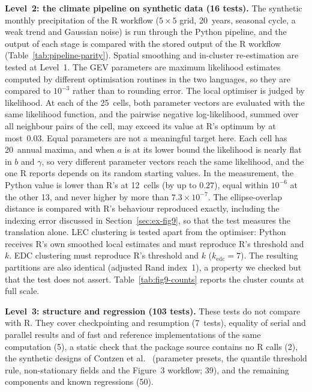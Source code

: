 \documentclass[preprint,12pt,a4paper]{elsarticle}
\begin{document}
{\textbf{Level~2: the climate pipeline on synthetic data (16 tests).}
The synthetic monthly precipitation of the R workflow ($5{\times}5$
grid, 20~years, seasonal cycle, a weak trend and Gaussian noise) is
run through the Python pipeline, and the output of each stage is
compared with the stored output of the R workflow
(Table~\ref{tab:pipeline-parity}). Spatial smoothing and in-cluster
re-estimation are tested at Level~1. The GEV parameters are maximum
likelihood estimates computed by different optimisation routines in
the two languages, so they are compared to $10^{-3}$ rather than to
rounding error.
The local optimiser is judged by likelihood. At each of the
25~cells, both parameter vectors are evaluated with the same
likelihood function, and the pairwise negative log-likelihood,
summed over all neighbour pairs of the cell, may exceed its value at
R's optimum by at most~0.03. Equal parameters are not a meaningful
target here. Each cell has 20~annual maxima, and when $a$ is at its
lower bound the likelihood is nearly flat in $b$ and $\gamma$, so
very different parameter vectors reach the same likelihood, and the
one R reports depends on its random starting values. In the
measurement, the Python value is lower than R's at 12~cells (by up
to $0.27$), equal within $10^{-6}$ at the other 13, and never higher
by more than $7.3\times10^{-7}$.
The ellipse-overlap distance is compared with R's behaviour
reproduced exactly, including the indexing error discussed in
Section~\ref{sec:ex-fig9}, so that the test measures the translation
alone. LEC clustering is tested apart from the optimiser: Python
receives R's own smoothed local estimates and must reproduce R's
threshold and $k$. EDC clustering must reproduce R's threshold and
$k$ ($k_{\text{edc}}=7$). The resulting partitions are also identical
(adjusted Rand index~1), a property we checked but that the test does
not assert.
Table~\ref{tab:fig9-counts} reports the cluster counts at full scale.

\textbf{Level~3: structure and regression (103 tests).}
These tests do not compare with R. They cover checkpointing and
resumption (7~tests), equality of serial and parallel results and
of fast and reference implementations of the same computation (5), a static check that the package source contains no R calls
(2), the synthetic designs of Contzen et al.~\cite{contzen2025}
(parameter presets, the quantile threshold rule, non-stationary
fields and the Figure~3 workflow; 39), and the remaining components
and known regressions (50).

}
\end{document}
